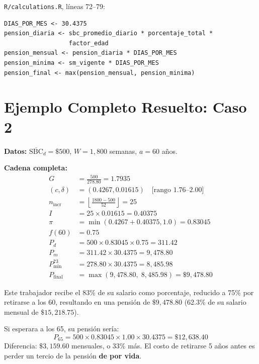 \documentclass[11pt,a4paper]{report}
\theoremstyle{remark}
\begin{document}
\begin{tcolorbox}[colback=orange!5!white, colframe=orange!75!black, title=\textbf{Aplicaci\'on en C\'odigo}]
\texttt{R/calculations.R}, l\'ineas 72--79:
\begin{lstlisting}
DIAS_POR_MES <- 30.4375
pension_diaria <- sbc_promedio_diario * porcentaje_total *
                  factor_edad
pension_mensual <- pension_diaria * DIAS_POR_MES
pension_minima <- sm_vigente * DIAS_POR_MES
pension_final <- max(pension_mensual, pension_minima)
\end{lstlisting}
\end{tcolorbox}

\section{Ejemplo Completo Resuelto: Caso 2}

\begin{tcolorbox}[colback=blue!5!white, colframe=blue!75!black, title=\textbf{Definici\'on Formal}]
\textbf{Datos:} $\overline{\text{SBC}}_d = \$500$, $W = 1{,}800$ semanas, $a = 60$ a\~nos.

\textbf{Cadena completa:}
\begin{align}
G &= \frac{500}{278.80} = 1.7935 \label{eq:ex_grupo} \\
(c, \delta) &= (0.4267, 0.01615) \quad \text{[rango 1.76--2.00]} \\
n_{\text{incr}} &= \left\lfloor \frac{1800 - 500}{52} \right\rfloor = 25 \\
I &= 25 \times 0.01615 = 0.40375 \\
\pi &= \min(0.4267 + 0.40375, 1.0) = 0.83045 \\
f(60) &= 0.75 \\
P_d &= 500 \times 0.83045 \times 0.75 = 311.42 \\
P_m &= 311.42 \times 30.4375 = 9{,}478.80 \\
P_{\min}^{73} &= 278.80 \times 30.4375 = 8{,}485.98 \\
P_{\text{final}} &= \max(9{,}478.80, \; 8{,}485.98) = \boxed{\$9{,}478.80}
\end{align}
\end{tcolorbox}

\begin{tcolorbox}[colback=green!5!white, colframe=green!50!black, title=\textbf{Intuici\'on}]
Este trabajador recibe el 83\% de su salario como porcentaje, reducido a 75\% por retirarse a los 60, resultando en una pensi\'on de $\$9{,}478.80$ (62.3\% de su salario mensual de $\$15{,}218.75$).

Si esperara a los 65, su pensi\'on ser\'ia:
\[
P_{65} = 500 \times 0.83045 \times 1.00 \times 30.4375 = \$12{,}638.40
\]
Diferencia: $\$3{,}159.60$ mensuales, o 33\% m\'as. El costo de retirarse 5 a\~nos antes es perder un tercio de la pensi\'on \textbf{de por vida}.
\end{tcolorbox}
\end{document}
